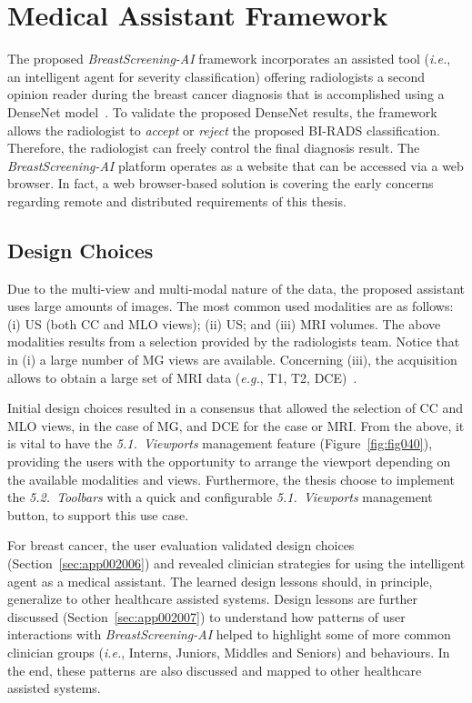 \section{Medical Assistant Framework}
\label{sec:app002003}

The proposed {\it BreastScreening-AI} framework incorporates an assisted tool ({\it i.e.}, an intelligent agent for severity classification) offering radiologists a second opinion reader during the breast cancer diagnosis that is accomplished  using  a DenseNet model~\cite{chen2019learning}.
To validate the proposed DenseNet results, the framework allows the radiologist to {\it accept} or {\it reject} the proposed \ac{BI-RADS} classification.
Therefore, the radiologist can freely control the final diagnosis result.
The {\it BreastScreening-AI} platform operates as a website that can be accessed via a web browser.
In fact, a web browser-based solution is covering the early concerns regarding remote and distributed requirements of this thesis.

\subsection{Design Choices}
\label{sec:app002003001}

Due to the multi-view and multi-modal nature of the data, the proposed assistant uses large amounts of images.
The most common used modalities are as follows:
(i) \ac{US} (both \ac{CC} and \ac{MLO} views);
(ii) \ac{US}; and
(iii) \ac{MRI} volumes.
The above modalities results from a selection provided by the radiologists team.
Notice that in (i) a large number of \ac{MG} views are available.
Concerning (iii), the acquisition allows to obtain a large set of \ac{MRI} data ({\it e.g.}, T1, T2, \ac{DCE})~\cite{seifabadi2019correlation}.

Initial design choices resulted in a consensus that allowed the selection of \ac{CC} and \ac{MLO} views, in the case of MG, 
and \ac{DCE} for the case or \ac{MRI}.
From the above, it is vital to have the \textit{5.1.~Viewports} management feature (Figure~\ref{fig:fig040}), providing the users with the opportunity to arrange the viewport depending on the available modalities and views.
Furthermore, the thesis choose to implement the \textit{5.2.~Toolbars} with a quick and configurable \textit{5.1.~Viewports} management button, to support this use case.

For breast cancer, the user evaluation validated design choices (Section~\ref{sec:app002006}) and revealed clinician strategies for using the intelligent agent as a medical assistant.
The learned design lessons should, in principle, generalize to other healthcare assisted systems.
Design lessons are further discussed (Section~\ref{sec:app002007}) to understand how patterns of user interactions with {\it BreastScreening-AI} helped to highlight some of more common clinician groups ({\it i.e.}, Interns, Juniors, Middles and Seniors) and behaviours.
In the end, these patterns are also discussed and mapped to other healthcare assisted systems.


